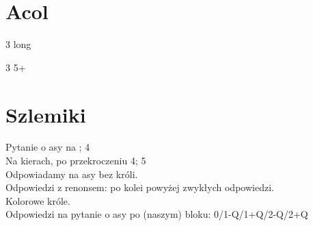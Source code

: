 \documentclass[12pt, a4paper]{report}
\begin{document}
\section{Acol}

\sequence{{2\clubs}{2\diams}}
\begin{options}[1]
    \item[3\clubs] long \diams\ \diams\ \lsf
    \item[3\diams] 5+\major
\end{options}

\section{Szlemiki}
Pytanie o asy na \major; 4\nt\\
Na kierach, po przekroczeniu 4\nt; 5\spades\\
Odpowiadamy na asy bez króli.\\
Odpowiedzi z renonsem: po kolei powyżej zwykłych odpowiedzi.\\
Kolorowe króle.\\
Odpowiedzi na pytanie o asy po (naszym) bloku: 0/1-Q/1+Q/2-Q/2+Q
\end{document}
